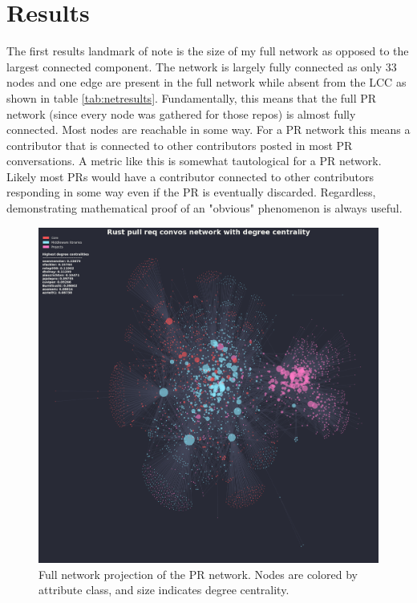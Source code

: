 \documentclass[12pt, a4paper]{article}
\begin{document}
\section{Results}
The first results landmark of note is the size of my full network as opposed to the largest connected component. The network is largely fully connected as only 33 nodes and one edge are present in the full network while absent from the LCC as shown in table \ref{tab:netresults}. Fundamentally, this means that the full PR network (since every node was gathered for those repos) is almost fully connected. Most nodes are reachable in some way. For a PR network this means a contributor that is connected to other contributors posted in most PR conversations. A metric like this is somewhat tautological for a PR network. Likely most PRs would have a contributor connected to other contributors responding in some way even if the PR is eventually discarded. Regardless, demonstrating mathematical proof of an "obvious" phenomenon is always useful.

\begin{figure}[ht!]
    \includegraphics[width=\linewidth]{network_full_degcent.png}
    \caption{Full network projection of the PR network. Nodes are colored by attribute class, and size indicates degree centrality.}
    \label{fig:fullnet}
\end{figure}
\end{document}
